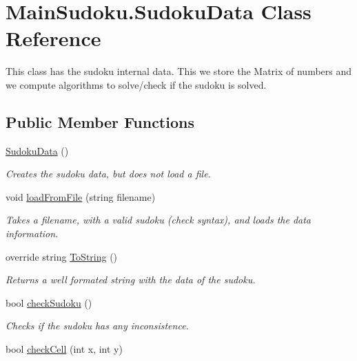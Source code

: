 \hypertarget{class_main_sudoku_1_1_sudoku_data}{\section{Main\-Sudoku.\-Sudoku\-Data Class Reference}
\label{class_main_sudoku_1_1_sudoku_data}
}


This class has the sudoku internal data. This we store the Matrix of numbers and we compute algorithms to solve/check if the sudoku is solved.  


\subsection*{Public Member Functions}
\begin{DoxyCompactItemize}
\item 
\hyperlink{class_main_sudoku_1_1_sudoku_data_a59f80af2146149e1deed36b446cb8a78}{Sudoku\-Data} ()
\begin{DoxyCompactList}\small\item\em Creates the sudoku data, but does not load a file. \end{DoxyCompactList}\item 
void \hyperlink{class_main_sudoku_1_1_sudoku_data_ad69a26e1f28daa9e3a9108d2104a7d44}{load\-From\-File} (string filename)
\begin{DoxyCompactList}\small\item\em Takes a filename, with a valid sudoku (check syntax), and loads the data information. \end{DoxyCompactList}\item 
override string \hyperlink{class_main_sudoku_1_1_sudoku_data_a52ee7f326e8ccacf81cbaa6626d3670c}{To\-String} ()
\begin{DoxyCompactList}\small\item\em Returns a well formated string with the data of the sudoku. \end{DoxyCompactList}\item 
bool \hyperlink{class_main_sudoku_1_1_sudoku_data_a55506ecd0ed6ad1ffd31eca808497be0}{check\-Sudoku} ()
\begin{DoxyCompactList}\small\item\em Checks if the sudoku has any inconsistence. \end{DoxyCompactList}\item 
bool \hyperlink{class_main_sudoku_1_1_sudoku_data_a9914c0993f31fb5631edaf80a3ffcd85}{check\-Cell} (int x, int y)

\end{DoxyCompactItemize}
